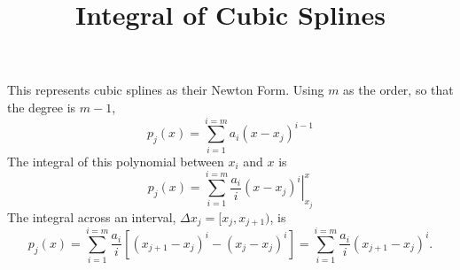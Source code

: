 \documentclass{article}
\title{Integral of Cubic Splines}
\begin{document}
This represents cubic splines as their Newton Form. Using $m$ as the order, so that
the degree is $m-1$,
\begin{equation}
 p_j(x) = \sum_{i=1}^{i=m} a_i(x-x_j)^{i-1}
\end{equation}
The integral of this polynomial between $x_i$ and $x$ is
\begin{equation}
 p_j(x) = \sum_{i=1}^{i=m} \left.\frac{a_i}{i}(x-x_j)^i\right|_{x_j}^{x}
\end{equation}
The integral across an interval, $\Delta x_j=[x_j,x_{j+1})$, is
\begin{equation}
 p_j(x) = \sum_{i=1}^{i=m} \frac{a_i}{i}\left[(x_{j+1}-x_{j})^i - (x_j-x_j)^i\right] = \sum_{i=1}^{i=m} \frac{a_i}{i}(x_{j+1}-x_{j})^i.
\end{equation}
\end{document}
